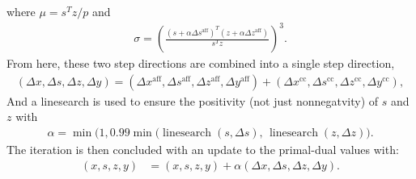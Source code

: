 %
where $\mu = s^Tz/p$ and
%
\begin{align}
    \sigma=\left(\frac{\left(s+\alpha \Delta s^{\mathrm{aff}}\right)^{T}\left(z+\alpha \Delta z^{\mathrm{aff}}\right)}{s^{T} z}\right)^{3}.
\end{align}
%
From here, these two step directions are combined into a single step direction,
%
\begin{align}
    (\Delta x, \Delta s, \Delta z, \Delta y) = (\Delta x^\text{aff}, \Delta s^\text{aff}, \Delta z^\text{aff}, \Delta y^\text{aff}) + (\Delta x^\text{cc}, \Delta s^\text{cc}, \Delta z^\text{cc}, \Delta y^\text{cc}),
\end{align}
%
And a linesearch is used to ensure the positivity (not just nonnegatvity) of $s$ and $z$ with
%
\begin{align}
    \alpha = \min\big(1, 0.99 \min(\operatorname{linesearch}(s, \Delta s),\, \operatorname{linesearch}(z, \Delta z)\big).
\end{align}
%
The iteration is then concluded with an update to the primal-dual values with:
%
\begin{align}
    (x, s, z, y) &= (x, s, z, y) + \alpha(\Delta x, \Delta s, \Delta z, \Delta y).
\end{align}
%
